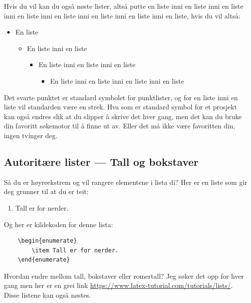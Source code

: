         Hvis du vil kan du også nøste lister, altså putte en liste inni en liste inni en liste inni en liste inni en liste inni en liste inni en liste inni en liste, hvis du vil altså:
        \begin{itemize}
            \item En liste
            \begin{itemize}
                \item En liste inni en liste
                \begin{itemize}
                    \item En liste inni en liste inni en liste
                    \begin{itemize}
                        \item En liste inni en liste inni en liste inni en liste
                    \end{itemize}
                \end{itemize}
            \end{itemize}
        \end{itemize}
    
        Det svarte punktet er standard symbolet for punktlister, og for en liste inni en liste vil standarden være en strek.
        Hva som er standard symbol for et prosjekt kan også endres slik at du slipper å skrive det hver gang, men det kan du bruke din favoritt søkemotor til å finne ut av. Eller det må ikke være favoritten din, ingen tvinger deg.
        
    
    \subsection{Autoritære lister --- Tall og bokstaver}
        Så du er høyreekstrem og vil rangere elementene i lista di? 
        Her er en liste som gir deg grunner til at du er teit:
        \begin{enumerate}
            \item Tall er for nerder.
        \end{enumerate}
        
        Og her er kildekoden for denne lista:
        \begin{verbatim}
    \begin{enumerate}
        \item Tall er for nerder.
    \end{enumerate}
        \end{verbatim}
        
        Hvordan endre mellom tall, bokstaver eller romertall? Jeg søker det opp for hver gang men her er en grei link \url{https://www.latex-tutorial.com/tutorials/lists/}.
        Disse listene kan også nøstes.


